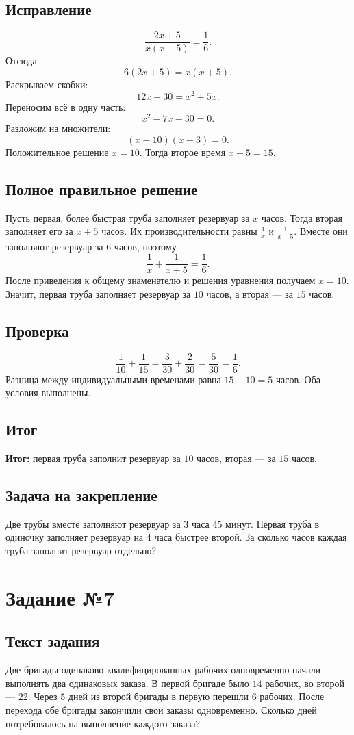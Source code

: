 \documentclass[12pt,a4paper]{article}
\newcommand{\result}{\textcolor{teal!60!black}{\textbf{Итог:}}}
\newcommand{\tasksection}[1]{\section*{Задание №#1}}
\begin{document}
\subsection*{Исправление}
\[
\frac{2x+5}{x(x+5)}=\frac{1}{6}.
\]
Отсюда
\[
6(2x+5)=x(x+5).
\]
Раскрываем скобки:
\[
12x+30=x^2+5x.
\]
Переносим всё в одну часть:
\[
x^2-7x-30=0.
\]
Разложим на множители:
\[
(x-10)(x+3)=0.
\]
Положительное решение $x=10$. Тогда второе время $x+5=15$.

\subsection*{Полное правильное решение}
Пусть первая, более быстрая труба заполняет резервуар за $x$ часов. Тогда вторая заполняет его за $x+5$ часов. Их производительности равны $\frac1x$ и $\frac1{x+5}$. Вместе они заполняют резервуар за $6$ часов, поэтому
\[
\frac1x+\frac1{x+5}=\frac16.
\]
После приведения к общему знаменателю и решения уравнения получаем $x=10$. Значит, первая труба заполняет резервуар за $10$ часов, а вторая --- за $15$ часов.

\subsection*{Проверка}
\[
\frac{1}{10}+\frac{1}{15}=\frac{3}{30}+\frac{2}{30}=\frac{5}{30}=\frac{1}{6}.
\]
Разница между индивидуальными временами равна $15-10=5$ часов. Оба условия выполнены.

\subsection*{Итог}
\result{} первая труба заполнит резервуар за $10$ часов, вторая --- за $15$ часов.

\subsection*{Задача на закрепление}
Две трубы вместе заполняют резервуар за $3$ часа $45$ минут. Первая труба в одиночку заполняет резервуар на $4$ часа быстрее второй. За сколько часов каждая труба заполнит резервуар отдельно?

\newpage
{}\label{task:7}
\tasksection{7}
\subsection*{Текст задания}
Две бригады одинаково квалифицированных рабочих одновременно начали выполнять два одинаковых заказа. В первой бригаде было $14$ рабочих, во второй --- $22$. Через $5$ дней из второй бригады в первую перешли $6$ рабочих. После перехода обе бригады закончили свои заказы одновременно. Сколько дней потребовалось на выполнение каждого заказа?
\end{document}
